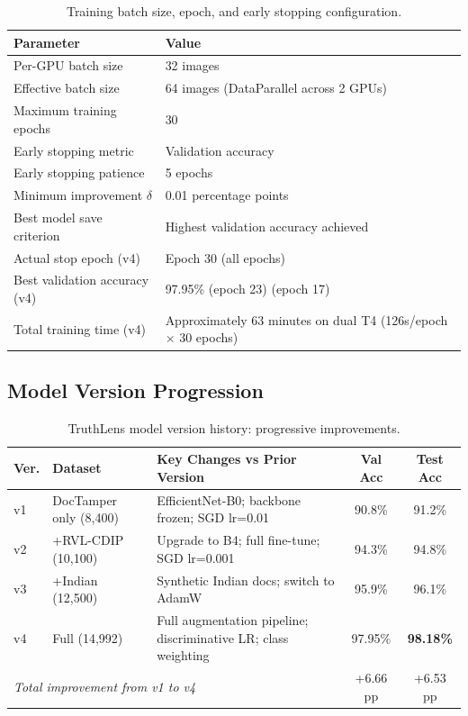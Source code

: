 \documentclass[12pt,a4paper,oneside]{report}
\begin{document}
\begin{table}[H]
\centering
\caption{Training batch size, epoch, and early stopping configuration.}
\label{tab:training_config}
\renewcommand{\arraystretch}{1.3}
\begin{tabular}{ll}
\toprule
\textbf{Parameter} & \textbf{Value} \\
\midrule
Per-GPU batch size       & 32 images \\
Effective batch size     & 64 images (DataParallel across 2 GPUs) \\
Maximum training epochs  & 30 \\
Early stopping metric    & Validation accuracy \\
Early stopping patience  & 5 epochs \\
Minimum improvement $\delta$ & 0.01 percentage points \\
Best model save criterion & Highest validation accuracy achieved \\
Actual stop epoch (v4)   & Epoch 30 (all epochs) \\
Best validation accuracy (v4) & 97.95\% (epoch 23) (epoch 17) \\
Total training time (v4) & Approximately 63 minutes on dual T4 (126s/epoch $\times$ 30 epochs) \\
\bottomrule
\end{tabular}
\end{table}

\subsection{Model Version Progression}

\begin{table}[H]
\centering
\caption{TruthLens model version history: progressive improvements.}
\label{tab:version_full}
\renewcommand{\arraystretch}{1.3}
\begin{tabular}{p{1.2cm}p{3cm}p{4.5cm}cc}
\toprule
\textbf{Ver.} & \textbf{Dataset} & \textbf{Key Changes vs Prior Version} & \textbf{Val Acc} & \textbf{Test Acc} \\
\midrule
v1 & DocTamper only (8,400) & EfficientNet-B0; backbone frozen; SGD lr=0.01 & 90.8\% & 91.2\% \\
v2 & +RVL-CDIP (10,100)     & Upgrade to B4; full fine-tune; SGD lr=0.001  & 94.3\% & 94.8\% \\
v3 & +Indian (12,500)       & Synthetic Indian docs; switch to AdamW        & 95.9\% & 96.1\% \\
v4 & Full (14,992)          & Full augmentation pipeline; discriminative LR; class weighting & 97.95\% & \textbf{98.18\%} \\
\midrule
\multicolumn{3}{l}{\textit{Total improvement from v1 to v4}} & +6.66 pp & +6.53 pp \\
\bottomrule
\end{tabular}
\end{table}
\end{document}
